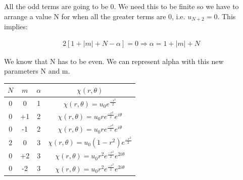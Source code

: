 All the odd terms are going to be 0. We need this to be finite so we have to arrange a value N for when all the greater terms are 0, i.e. $u_{N+2} = 0$. This implies:

\begin{equation}
  \begin{array}{c}
    2[1+|m|+N-\alpha] = 0 \Rightarrow \alpha= 1+|m|+N
  \end{array}
\end{equation}

We know that N has to be even. We can represent alpha with this new parameters N and m.

\begin{tabular}{| c | c | c | c |}
  \hline
  $N$ & $m$ & $\alpha$ & $\chi(r,\theta)$ \\
  \hline
  0 & 0 & 1  & $\chi(r,\theta) = u_0 e^{\frac{-r^2}{2}}$              \\
  \hline
  0 & +1 & 2 & $\chi(r,\theta) = u_0re^{\frac{-r^2}{2}}e^{i\theta}$   \\
  \hline
  0 & -1 & 2 & $\chi(r,\theta) = u_0 re^{\frac{-r^2}{2}}e^{i\theta}$  \\
  \hline
  2 & 0 & 3  & $\chi(r, \theta) = u_0(1-r^2)e^{\frac{-r^2}{2}}$ \\
  \hline
  0 & +2 & 3 & $\chi(r, \theta) = u_0r^2e^{\frac{-r^2}{2}}e^{2i\theta}$ \\
  \hline
  0 & -2 & 3 & $\chi(r, \theta) = u_0r^2e^{\frac{-r^2}{2}}e^{2i\theta}$ \\
  \hline
\end{tabular}




